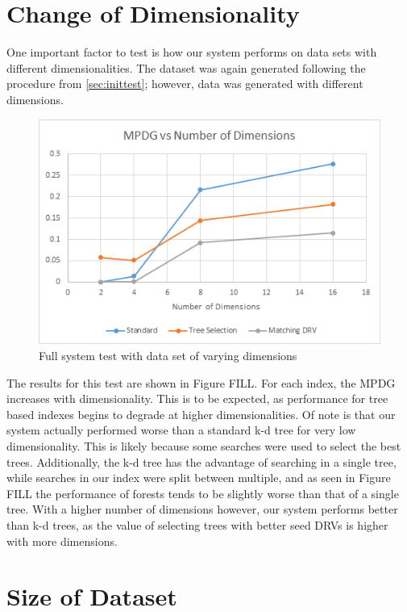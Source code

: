 \section{Change of Dimensionality}

One important factor to test is how our system performs on data sets with different dimensionalities.  The dataset was again generated following the procedure from \ref{sec:inittest}; however, data was generated with different dimensions.

\begin{figure}[h]
\begin{center}
\includegraphics[width=.85\textwidth]{Figures/dims}
\end{center}
\caption{Full system test with data set of varying dimensions}
\label{fig:dim}
\end{figure}

The results for this test are shown in Figure FILL.  For each index, the MPDG increases with dimensionality.  This is to be expected, as performance for tree based indexes begins to degrade at higher dimensionalities.  Of note is that our system actually performed worse than a standard k-d tree for very low dimensionality.  This is likely because some searches were used to select the best trees.  Additionally, the k-d tree has the advantage of searching in a single tree, while searches in our index were split between multiple, and as seen in Figure FILL the performance of forests tends to be slightly worse than that of a single tree.  With a higher number of dimensions however, our system performs better than k-d trees, as the value of selecting trees with better seed DRVs is higher with more dimensions.

\section{Size of Dataset}

